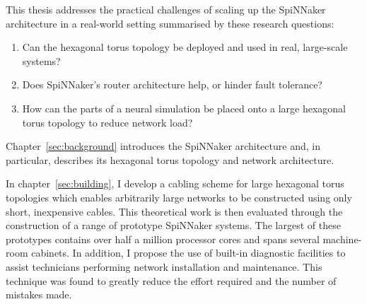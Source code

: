 %

This thesis addresses the practical challenges of scaling up the SpiNNaker
architecture in a real-world setting summarised by these research questions:

\begin{enumerate}
	
	\item Can the hexagonal torus topology be deployed and used in real,
	large-scale systems?
	
	\item Does SpiNNaker's router architecture help, or hinder fault tolerance?
	
	\item How can the parts of a neural simulation be placed onto a large
	hexagonal torus topology to reduce network load?
	
\end{enumerate}

%

Chapter~\ref{sec:background} introduces the SpiNNaker architecture and, in
particular, describes its hexagonal torus topology and network architecture.

In chapter~\ref{sec:building}, I develop a cabling scheme for large hexagonal
torus topologies which enables arbitrarily large networks to be constructed
using only short, inexpensive cables. This theoretical work is then evaluated
through the construction of a range of prototype SpiNNaker systems. The largest
of these prototypes contains over half a million processor cores and spans
several machine-room cabinets. In addition, I propose the use of built-in
diagnostic facilities to assist technicians performing network installation and
maintenance. This technique was found to greatly reduce the effort required and
the number of mistakes made.

